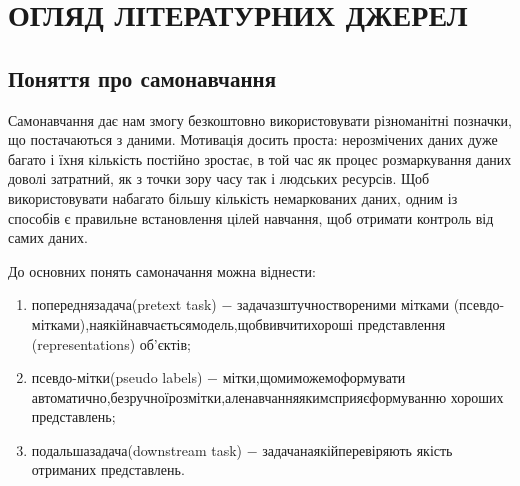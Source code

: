 \section{ОГЛЯД ЛІТЕРАТУРНИХ ДЖЕРЕЛ}
\label{sec:Theory}

\subsection{Поняття про самонавчання}

Самонавчання дає нам змогу безкоштовно використовувати різноманітні позначки, що постачаються з даними. Мотивація досить проста: нерозмічених даних дуже багато і їхня кількість постійно зростає, в той час як процес розмаркування даних доволі затратний, як з точки зору часу так і людських ресурсів. Щоб використовувати набагато більшу кількість немаркованих даних, одним із способів є правильне встановлення цілей навчання, щоб отримати контроль від самих даних.

До основних понять самоначання можна віднести:

\begin{enumerate}
	\item попередня\hfill задача\hfill (pretext task) $-$ задача\hfill з\hfill штучно\hfill створеними\newline \hspace*{-20mm} мітками (псевдо-мітками),\hfill на\hfill якій\hfill навчається\hfill модель,\hfill щоб\hfill вивчити\hfill хороші\newline \hspace*{-20mm} представлення (representations) об'єктів;
	\item псевдо-мітки\hfill (pseudo labels) $-$ мітки,\hfill що\hfill ми\hfill можемо\hfill формувати\newline \hspace*{-20mm} автоматично,\hfill без\hfill ручної\hfill розмітки,\hfill але\hfill навчання\hfill яким\hfill сприяє\hfill формуванню\newline \hspace*{-20mm} хороших представлень;
	\item подальша\hfill задача\hfill (downstream task) $-$ задача\hfill на\hfill якій\hfill перевіряють\newline \hspace*{-20mm} якість отриманих представлень. 
\end{enumerate}
		
